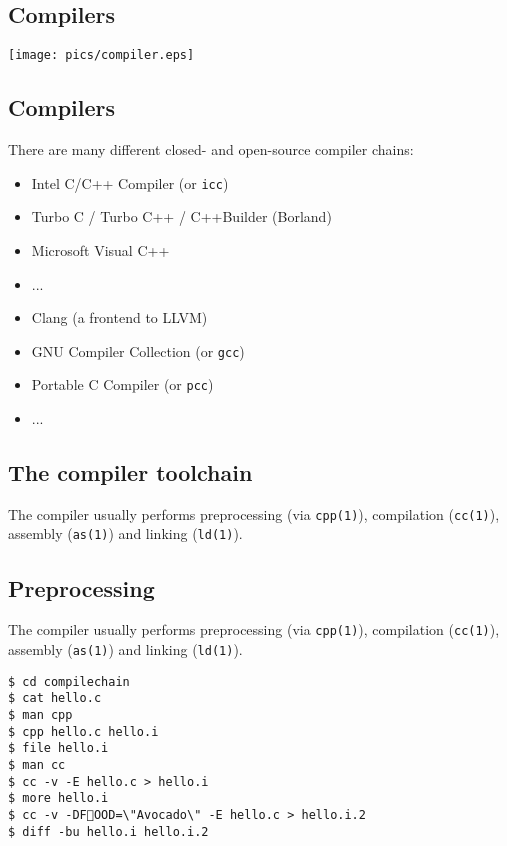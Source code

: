 \documentclass[xga]{xdvislides}
\begin{document}
\subsection{Compilers}

\begin{center}
	\texttt{[image: pics/compiler.eps]}
\end{center}


\subsection{Compilers}

There are many different closed- and open-source compiler chains:

\begin{itemize}
	\item Intel C/C++ Compiler (or \verb+icc+)
	\item Turbo C / Turbo C++ / C++Builder (Borland)
	\item Microsoft Visual C++
	\item ...
\\

	\item Clang (a frontend to LLVM)
	\item GNU Compiler Collection (or \verb+gcc+)
	\item Portable C Compiler (or \verb+pcc+)
	\item ...
\end{itemize}

\subsection{The compiler toolchain}

The compiler usually performs preprocessing (via {\tt cpp(1)}), compilation
({\tt cc(1)}), assembly ({\tt as(1)}) and linking ({\tt ld(1)}).

\subsection{Preprocessing}

The compiler usually performs preprocessing (via {\tt cpp(1)}), compilation
({\tt cc(1)}), assembly ({\tt as(1)}) and linking ({\tt ld(1)}).

\begin{verbatim}
$ cd compilechain
$ cat hello.c
$ man cpp
$ cpp hello.c hello.i
$ file hello.i
$ man cc
$ cc -v -E hello.c > hello.i
$ more hello.i
$ cc -v -DFOOD=\"Avocado\" -E hello.c > hello.i.2
$ diff -bu hello.i hello.i.2
\end{verbatim}
\end{document}
